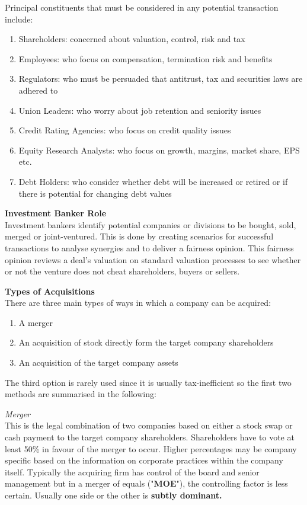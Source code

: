 \documentclass[10pt, a4paper]{article}
\begin{document}
\vspace{5pt}
\noindent Principal constituents that must be considered in any potential transaction include:
\begin{enumerate}
	\item Shareholders: concerned about valuation, control, risk and tax
	\item Employees: who focus on compensation, termination risk and benefits
	\item Regulators: who must be persuaded that antitrust, tax and securities laws are adhered to
	\item Union Leaders: who worry about job retention and seniority issues
	\item Credit Rating Agencies: who focus on credit quality issues
	\item Equity Research Analysts: who focus on growth, margins, market share, EPS etc.
	\item Debt Holders: who consider whether debt will be increased or retired or if there is potential for changing debt values
\end{enumerate}

\vspace{10pt}
\noindent \textbf{Investment Banker Role}\\
Investment bankers identify potential companies or divisions to be bought, sold, merged or joint-ventured. This is done by creating scenarios for successful transactions to analyse synergies and to deliver a fairness opinion. This fairness opinion reviews a deal's valuation on standard valuation processes to see whether or not the venture does not cheat shareholders, buyers or sellers.

\vspace{10pt}
\noindent \textbf{Types of Acquisitions}\\
There are three main types of ways in which a company can be acquired:
\begin{enumerate}
	\item A merger
	\item An acquisition of stock directly form the target company shareholders
	\item An acquisition of the target company assets
\end{enumerate}
\vspace{5pt}
\noindent The third option is rarely used since it is usually tax-inefficient so the first two methods are summarised in the following:

\vspace{5pt}
\noindent \textit{Merger}\\
This is the legal combination of two companies based on either a stock swap or cash payment to the target company shareholders. Shareholders have to vote at least 50\% in favour of the merger to occur. Higher percentages may be company specific based on the information on corporate practices within the company itself. Typically the acquiring firm has control of the board and senior management but in a merger of equals ("\textbf{MOE}"), the controlling factor is less certain. Usually one side or the other is \textbf{subtly dominant.}
\end{document}
